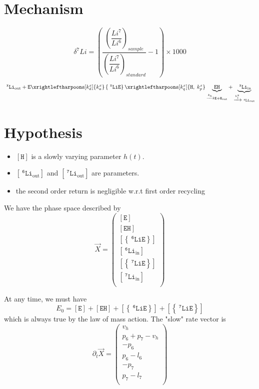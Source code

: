 \documentclass[aps,onecolumn,11pt]{revtex4}
\newcommand{\mychem}[1]{\mathtt{#1}}
\newcommand{\myconc}[1]{\left\lbrack{#1}\right\rbrack}
\newcommand{\spLi}[1]{{~^{\mychem{#1}}\mychem{Li}}}
\newcommand{\spEout}{\mychem{E}}
\newcommand{\Eout}{\myconc{\spEout}}
\newcommand{\spLiE}[1]{\left\lbrace\spLi{#1}\spEout\right\rbrace}
\newcommand{\LiE}[1]{\myconc{\spLiE{#1}}}
\newcommand{\spLiIn}[1]{{\spLi{#1}}_{\mathrm{in}}}
\newcommand{\LiIn}[1]{\myconc{\spLiIn{#1}}}
\newcommand{\spLiOut}[1]{{\spLi{#1}}_{\mathrm{out}}}
\newcommand{\LiOut}[1]{\myconc{\spLiOut{#1}}}
\newcommand{\spEHin}{\mychem{EH}}
\newcommand{\EHin}{\myconc{\spEHin}}
\newcommand{\spproton}{\mychem{H}}
\newcommand{\proton}{\myconc{\spproton}}
\begin{document}
\section{Mechanism}
$$
	\delta^7Li = \left(
		\dfrac{\left(\dfrac{Li^7}{Li^6}\right)_{sample}}
		{\left(\dfrac{Li^7}{Li^6}\right)_{standard}}
		 -1 
	\right) \times 1000
$$


\begin{equation}
	 \spLiOut{x} +  \spEout  
	 \xrightleftharpoons[k_d^x]{k_a^x} 
	 \spLiE{x}
	  \xrightleftharpoons[k_q^x]{\mychem{H},\;k_p^x} \underbrace{\spEHin}_{\xrightarrow[]{k_h} \mychem{E} + \mychem{H}_{\mathrm{out}}} + \underbrace{\spLiIn{x}}_{\xrightarrow[]{k_l^x} \spLiOut{x}}
\end{equation}

\section{Hypothesis}
\begin{itemize}
\item $\proton$ is a slowly varying parameter $h(t)$.
\item $\LiOut{6}$ and  $\LiOut{7}$ are parameters.
\item the second order return is negligible w.r.t first order recycling
\end{itemize}

We have the phase space described by
\begin{equation}
 \vec{X} = 
        \begin{pmatrix}
        \Eout\\
        \EHin\\
        \LiE{6}\\
        \LiIn{6}\\
        \LiE{7}\\
        \LiIn{7}\\
        \end{pmatrix}
\end{equation}

At any time, we must have
\begin{equation} 
	\label{eq:E0}
	E_0 = \Eout + \EHin +  \LiE{6} + \LiE{7}
\end{equation}
which is always true by the law of mass action.
The "slow" rate vector is
\begin{equation}
	\partial_t\vec{X} = 
	\begin{pmatrix}
		v_h\\
		p_6+p_7-v_h\\
		-p_6\\
		p_6-l_6\\
		-p_7\\
		p_7-l_7\\
	\end{pmatrix}
\end{equation}
\end{document}
